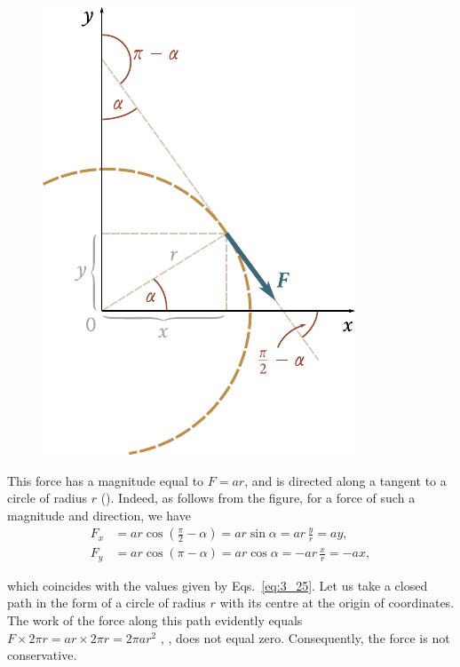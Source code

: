 \begin{figure}[t]
	\begin{center}
		\includegraphics[scale=0.95]{figures/ch_03/fig_3_8.pdf}
		\caption[]{}
		\label{fig:3_8}
	\end{center}
	\vspace{-0.7cm}
\end{figure}

\noindent
This force has a magnitude equal to $F=ar$, and is directed along a tangent to a circle of radius $r$ (). Indeed, as follows from the figure, for a force of such a magnitude and direction, we have
\begin{align*}
F_x &= ar\cos\left(\frac{\pi}{2}-\alpha\right) = ar\sin\alpha = ar\,\frac{y}{r} = ay,\\
F_y &= ar\cos(\pi-\alpha) = ar\cos\alpha = -ar\,\frac{x}{r} = -ax,
\end{align*}

\noindent
which coincides with the values given by Eqs.~\eqref{eq:3_25}. Let us take a closed path in the form of a circle of radius $r$ with its centre at the origin of coordinates. The work of the force along this path evidently equals $F\times 2\pi r=ar\times 2\pi r=2\pi ar^2$ , \ie, does not equal zero. Consequently, the force is not conservative.

